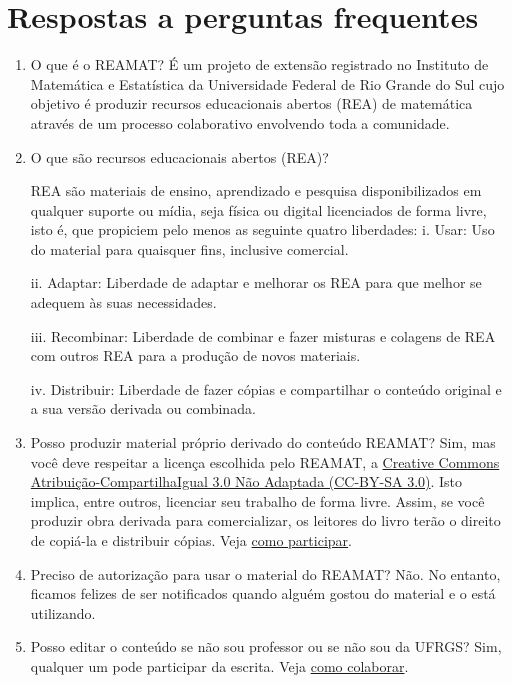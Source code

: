 \documentclass[12pt]{report}
\begin{document}
\chapter*{Respostas a perguntas frequentes}
\begin{enumerate}
\item  O que é o REAMAT?
É um projeto de extensão registrado no Instituto de Matemática e Estatística da Universidade Federal de Rio Grande do Sul cujo objetivo é produzir recursos educacionais abertos (REA) de matemática através de um processo colaborativo envolvendo toda a comunidade.

\item O que são recursos educacionais abertos (REA)?

REA são materiais de ensino, aprendizado e pesquisa disponibilizados em qualquer suporte ou mídia, seja física ou digital licenciados de forma livre, isto é, que propiciem pelo menos as seguinte quatro liberdades:
\subitem i. Usar: Uso do material para quaisquer fins, inclusive comercial.

\subitem ii. Adaptar: Liberdade de adaptar e melhorar os REA para que melhor se adequem às suas necessidades.

\subitem iii. Recombinar: Liberdade de combinar e fazer misturas e colagens de REA com outros REA para a produção de novos materiais.

\subitem iv. Distribuir: Liberdade de fazer cópias e compartilhar o conteúdo original e a sua versão derivada ou combinada.

\item Posso produzir material próprio derivado do conteúdo REAMAT?
Sim, mas você deve respeitar a licença escolhida pelo REAMAT, a \href{https://creativecommons.org/licenses/by-sa/3.0/}{Creative Commons Atribuição-CompartilhaIgual 3.0 Não Adaptada (CC-BY-SA 3.0)}. Isto implica, entre outros, licenciar seu trabalho de forma livre. Assim, se você produzir obra derivada para comercializar, os leitores do livro terão o direito de copiá-la e distribuir cópias. Veja \href{https://www.ufrgs.br/reamat/participe.html}{como participar}.

\item Preciso de autorização para usar o material do REAMAT?
Não. No entanto, ficamos felizes de ser notificados quando alguém gostou do material e o está utilizando.

\item Posso editar o conteúdo se não sou professor ou se não sou da UFRGS?
Sim, qualquer um pode participar da escrita. Veja \href{https://www.ufrgs.br/reamat/participe.html}{como colaborar}.


\end{enumerate}
\end{document}
